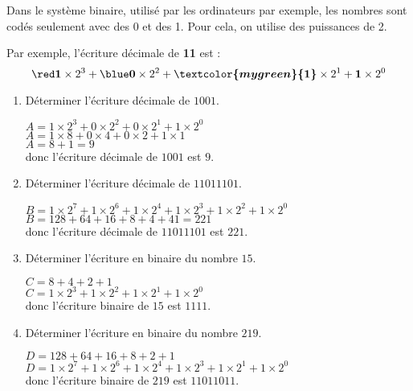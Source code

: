     Dans le système binaire, utilisé par les ordinateurs par exemple, les nombres sont codés seulement avec
    des 0 et des 1. Pour cela, on utilise des puissances de 2.

    Par exemple, l’écriture décimale de {\bfseries {}{}\textcolor{mygreen}{1}1} est :
    $$\boldsymbol{{\red 1}} \times 2^3 + \boldsymbol{{\blue 0}} \times 2^2 + \boldsymbol{{\textcolor{mygreen}{1}}} \times 2^1 + \boldsymbol{1} \times 2^0$$
    \begin{enumerate}
        \item Déterminer l’écriture décimale de $1001$.

        {\red
        $A= 1 \times 2^3 + 0 \times 2^2 + 0 \times 2^1 +  1\times 2^0$\\
        $A= 1 \times 8 + 0 \times 4 + 0 \times 2 +  1\times 1$\\
        $A= 8+1 = 9$\\
        donc l'écriture décimale de $1001$ est $9$.
        }
        \item Déterminer l’écriture décimale de $11011101$.

        {\red
        $B= 1 \times 2^7 + 1\times 2^6 + 1\times 2^4 + 1\times 2^3 + 1\times 2^2 + 1\times 2^0$\\
        $B= 128+64+16+8+4+41=221$\\
        donc l'écriture décimale de $11011101$ est $221$.
        }
        \item Déterminer l’écriture en binaire du nombre $15$.

        {\red
        $C=8+4+2+1$\\
        $C=1\times 2^3 + 1\times 2^2 + 1\times 2^1 + 1\times 2^0$\\
        donc l'écriture binaire de $15$ est $1111$.
        }
        \item Déterminer l’écriture en binaire du nombre $219$.

        {\red
        $D=128+64+16+8+2+1$\\
        $D=1\times 2^7 + 1\times 2^6 + 1\times 2^4 + 1\times 2^3 + 1\times 2^1 + 1\times 2^0$\\
        donc l'écriture binaire de $219$ est $11011011$.
        }

    \end{enumerate}
